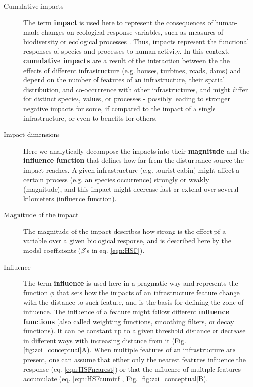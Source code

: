 \documentclass[titlepage]{article}
\begin{document}
\begin{tcolorbox}[width=1.3\textwidth,center,colback=yellow!5,colframe=yellow!75!black,title={Box 1 -- Definitions}]

\begin{description}

    \item[Cumulative impacts] The term \textbf{impact} is used here to represent the consequences of human-made changes on ecological response variables, such as measures of biodiversity or ecological processes \citep{naugle_unifying_2011}. Thus, impacts represent the functional responses of species and processes to human activity. In this context, \textbf{cumulative impacts} are a result of the interaction between the the effects of different infrastructure (e.g. houses, turbines, roads, dams) and depend on the number of features of an infrastructure, their spatial distribution, and co-occurrence with other infrastructures, and might differ for distinct species, values, or processes - possibly leading to stronger negative impacts for some, if compared to the impact of a single infrastructure, or even to benefits for others.
    
    \item[Impact dimensions] Here we analytically decompose the impacts into their \textbf{magnitude} and the \textbf{influence function} that defines how far from the disturbance source the impact reaches. A given infrastructure (e.g. tourist cabin) might affect a certain process (e.g. an species occurrence) strongly or weakly (magnitude), and this impact might decrease fast or extend over several kilometers (influence function).
    
    \item[Magnitude of the impact] The magnitude of the impact describes how strong is the effect pf a variable over a given biological response, and is described here by the model coefficients ($\beta$'s in eq. \ref{eqn:HSF}). 
    
    \item[Influence] The term \textbf{influence} is used here in a pragmatic way and represents the function $\phi$ that sets how the impacts of an infrastructure feature change with the distance to such feature, and is the basis for defining the zone of influence.
    The influence of a feature might follow different \textbf{influence functions} (also called weighting functions, smoothing filters, or decay functions). It can be constant up to a given threshold distance or decrease in different ways with increasing distance from it (Fig. \ref{fig:zoi_conceptual}A). When multiple features of an infrastructure are present, one can assume that either only the nearest features influence the response (eq. \ref{eqn:HSFnearest}) or that the influence of multiple features accumulate (eq. \ref{eqn:HSFcuminf}, Fig. \ref{fig:zoi_conceptual}B).
    

\end{description}
\end{tcolorbox}
\end{document}
